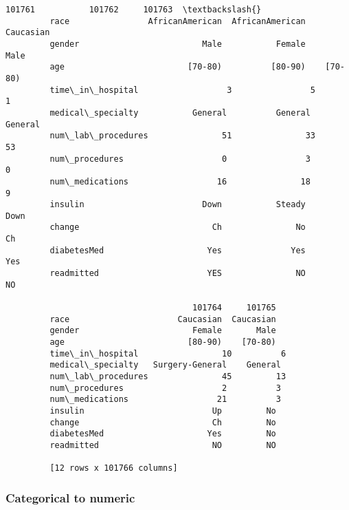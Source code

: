 \documentclass[11pt]{article}
\begin{document}
\begin{Verbatim}[commandchars=\\\{\}]
                                      101761           101762     101763  \textbackslash{}
         race                AfricanAmerican  AfricanAmerican  Caucasian   
         gender                         Male           Female       Male   
         age                         [70-80)          [80-90)    [70-80)   
         time\_in\_hospital                  3                5          1   
         medical\_specialty           General          General    General   
         num\_lab\_procedures               51               33         53   
         num\_procedures                    0                3          0   
         num\_medications                  16               18          9   
         insulin                        Down           Steady       Down   
         change                           Ch               No         Ch   
         diabetesMed                     Yes              Yes        Yes   
         readmitted                      YES               NO         NO   
         
                                      101764     101765  
         race                      Caucasian  Caucasian  
         gender                       Female       Male  
         age                         [80-90)    [70-80)  
         time\_in\_hospital                 10          6  
         medical\_specialty   Surgery-General    General  
         num\_lab\_procedures               45         13  
         num\_procedures                    2          3  
         num\_medications                  21          3  
         insulin                          Up         No  
         change                           Ch         No  
         diabetesMed                     Yes         No  
         readmitted                       NO         NO  
         
         [12 rows x 101766 columns]
\end{Verbatim}
            
    \hypertarget{categorical-to-numeric}{%
\subsubsection{Categorical to numeric}\label{categorical-to-numeric}}
\end{document}
